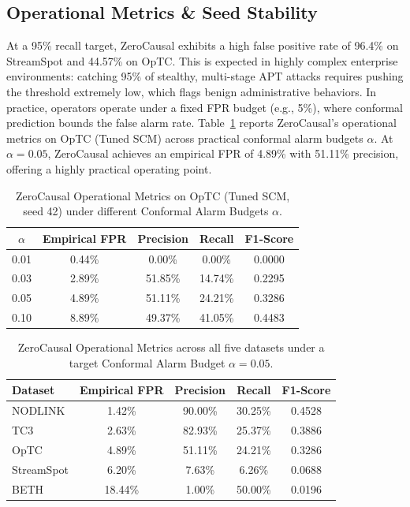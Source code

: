 \subsection{Operational Metrics \& Seed Stability}
At a 95\% recall target, ZeroCausal exhibits a high false positive rate of 96.4\% on StreamSpot and 44.57\% on OpTC. This is expected in highly complex enterprise environments: catching 95\% of stealthy, multi-stage APT attacks requires pushing the threshold extremely low, which flags benign administrative behaviors. In practice, operators operate under a fixed FPR budget (e.g., 5\%), where conformal prediction bounds the false alarm rate. Table~\ref{tab:optc_operational} reports ZeroCausal's operational metrics on OpTC (Tuned SCM) across practical conformal alarm budgets $\alpha$. At $\alpha=0.05$, ZeroCausal achieves an empirical FPR of 4.89\% with 51.11\% precision, offering a highly practical operating point.

\begin{table}[htbp]
\centering
\caption{ZeroCausal Operational Metrics on OpTC (Tuned SCM, seed 42) under different Conformal Alarm Budgets $\alpha$.}
\begin{tabular}{ccccc}
\toprule
$\alpha$ & Empirical FPR & Precision & Recall & F1-Score \\
\midrule
0.01 & 0.44\% & 0.00\% & 0.00\% & 0.0000 \\
0.03 & 2.89\% & 51.85\% & 14.74\% & 0.2295 \\
0.05 & 4.89\% & 51.11\% & 24.21\% & 0.3286 \\
0.10 & 8.89\% & 49.37\% & 41.05\% & 0.4483 \\
\bottomrule
\end{tabular}
\label{tab:optc_operational}
\end{table}

\begin{table}[htbp]
\centering
\caption{ZeroCausal Operational Metrics across all five datasets under a target Conformal Alarm Budget $\alpha = 0.05$.}
\begin{tabular}{lcccc}
\toprule
Dataset & Empirical FPR & Precision & Recall & F1-Score \\
\midrule
NODLINK & 1.42\% & 90.00\% & 30.25\% & 0.4528 \\
TC3 & 2.63\% & 82.93\% & 25.37\% & 0.3886 \\
OpTC & 4.89\% & 51.11\% & 24.21\% & 0.3286 \\
StreamSpot & 6.20\% & 7.63\% & 6.26\% & 0.0688 \\
BETH & 18.44\% & 1.00\% & 50.00\% & 0.0196 \\
\bottomrule
\end{tabular}
\label{tab:operational_breadth}
\par{}
\end{table}

